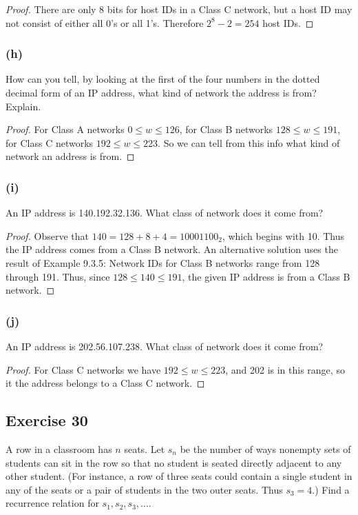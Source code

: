 \documentclass[14pt]{extarticle}
\begin{document}
\begin{proof}
There are only 8 bits for host IDs in a Class C network, but a host ID may not consist of either all 0’s or all 1’s. 
Therefore \(2^8 - 2 = 254\) host IDs.
\end{proof}

\subsubsection{(h)}
How can you tell, by looking at the first of the four numbers in the dotted decimal form of an IP address, what 
kind of network the address is from? Explain.

\begin{proof}
For Class A networks \(0 \leq w \leq 126\), for Class B networks \(128 \leq w \leq 191\), for Class C networks 
\(192 \leq w \leq 223\). So we can tell from this info what kind of network an address is from.
\end{proof}

\subsubsection{(i)}
An IP address is 140.192.32.136. What class of network does it come from?

\begin{proof}
Observe that \(140 = 128 + 8 + 4 = 10001100_2\), which begins with 10. Thus the IP address comes from a Class B 
network. An alternative solution uses the result of Example 9.3.5: Network IDs for Class B networks range from 128 
through 191. Thus, since \(128 \leq 140 \leq 191\), the given IP address is from a Class B network.
\end{proof}

\subsubsection{(j)}
An IP address is 202.56.107.238. What class of network does it come from?

\begin{proof}
For Class C networks we have \(192 \leq w \leq 223\), and 202 is in this range, so it the address belongs to a Class
C network.
\end{proof}

\subsection{Exercise 30}
A row in a classroom has $n$ seats. Let \(s_n\) be the number of ways nonempty sets of students can sit in the row 
so that no student is seated directly adjacent to any other student. (For instance, a row of three seats could contain 
a single student in any of the seats or a pair of students in the two outer seats. Thus \(s_3 = 4\).) Find a 
recurrence relation for \(s_1, s_2, s_3, \ldots\).
\end{document}
